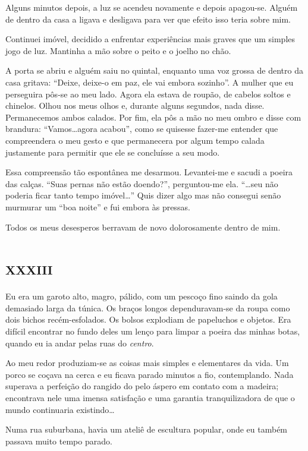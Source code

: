 Alguns minutos depois, a luz se acendeu novamente e depois apagou-se. Alguém de dentro da casa a ligava e desligava para ver que efeito isso teria sobre mim.

Continuei imóvel, decidido a enfrentar experiências mais graves que um simples jogo de luz. Mantinha a mão sobre o peito e o joelho no chão.

A porta se abriu e alguém saiu no quintal, enquanto uma voz grossa de dentro da casa gritava: ``Deixe, deixe-o em paz, ele vai embora sozinho''. A mulher que eu perseguira pôs-se ao meu lado. Agora ela estava de roupão, de cabelos soltos e chinelos. Olhou nos meus olhos e, durante alguns segundos, nada disse. Permanecemos ambos calados. Por fim, ela pôs a mão no meu ombro e disse com brandura: ``Vamos\dots agora acabou'', como se quisesse fazer-me entender que compreendera o meu gesto e que permanecera por algum tempo calada justamente para permitir que ele se concluísse a seu modo.

Essa compreensão tão espontânea me desarmou. Levantei-me e sacudi a poeira das calças. ``Suas pernas não estão doendo?'', perguntou-me ela. ``\ldots seu não poderia ficar tanto tempo imóvel\dots'' Quis dizer algo mas não consegui senão murmurar um ``boa noite'' e fui embora às pressas.

Todos os meus desesperos berravam de novo dolorosamente dentro de mim.


\chapter*{\huge\centering\textsc{xxxiii}}

Eu era um garoto alto, magro, pálido, com um pescoço fino saindo da gola demasiado larga da túnica. Os braços longos dependuravam-se da roupa como dois bichos recém-esfolados. Os bolsos explodiam de papeluchos e objetos. Era difícil encontrar no fundo deles um lenço para limpar a poeira das minhas botas, quando eu ia andar pelas ruas do \textit{centro}.

Ao meu redor produziam-se as coisas mais simples e elementares da vida. Um porco se coçava na cerca e eu ficava parado minutos a fio, contemplando. Nada superava a perfeição do rangido do pelo áspero em contato com a madeira; encontrava nele uma imensa satisfação e uma garantia tranquilizadora de que o mundo continuaria existindo\dots

Numa rua suburbana, havia um ateliê de escultura popular, onde eu também passava muito tempo parado.

